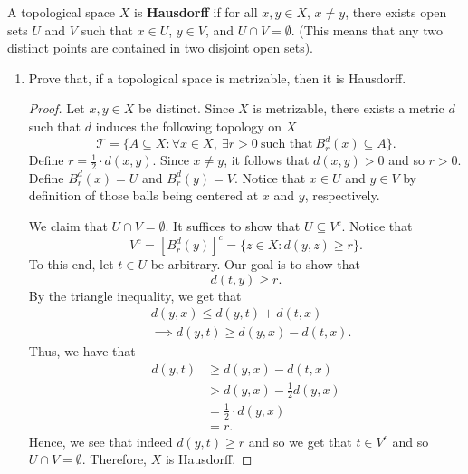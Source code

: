 \documentclass[a4paper]{article}
\begin{document}
\begin{problem}
    A topological space \( X  \) is \textbf{Hausdorff} if for all \( x,y \in X  \), \( x \neq y  \), there exists open sets \( U  \) and \( V  \) such that \( x \in U  \), \( y \in V  \), and \( U \cap V = \emptyset \). (This means that any two distinct points are contained in two disjoint open sets).
\end{problem}
\begin{enumerate}
    \item[(i)] Prove that, if a topological space is metrizable, then it is Hausdorff.
        \begin{proof}
        Let \( x,y \in X  \) be distinct. Since \( X  \) is metrizable, there exists a metric \( d  \) such that \( d  \) induces the following topology on \( X  \)
        \[  \mathcal{T} = \{  A \subseteq  X : \forall x \in X , \ \exists r > 0 \ \text{such that} \ {B}_{r}^{d}(x) \subseteq A  \}. \]
        Define \( r = \frac{ 1 }{ 2 }  \cdot d(x,y) \). Since \( x \neq y  \), it follows that \( d(x,y) > 0  \) and so \( r > 0  \). Define \( {B}_{r}^{d}(x) = U  \) and \( {B}_{r}^{d}(y) = V  \). Notice that \( x \in  U   \) and \( y \in V  \) by definition of those balls being centered at \( x  \) and \( y  \), respectively.

        We claim that \( U \cap V = \emptyset  \). It suffices to show that \( U \subseteq V^{c} \). Notice that  
        \[  V^{c} = [{B}_{r}^{d}(y)]^{c} = \{ z \in X : d(y,z) \geq r  \}. \]
        To this end, let \( t \in U  \) be arbitrary. Our goal is to show that \[ d(t,y) \geq r.  \]
        By the triangle inequality, we get that 
        \begin{align*}
            &d(y,x) \leq d(y,t) + d(t,x) \\
            &\implies d(y,t) \geq d(y,x) - d(t,x).
        \end{align*}
        Thus, we have that 
        \begin{align*}
            d(y,t) &\geq d(y,x) - d(t,x) \\
                   &> d(y,x) - \frac{ 1 }{ 2 }  d(y,x) \\
                   &= \frac{ 1 }{ 2 } \cdot  d(y,x) \\
                   &= r.  
        \end{align*}
        Hence, we see that indeed \( d(y,t) \geq r  \) and so we get that \( t \in V^{c} \) and so \( U \cap V = \emptyset \). Therefore, \( X  \) is Hausdorff.
        \end{proof}


\end{enumerate}
\end{document}
